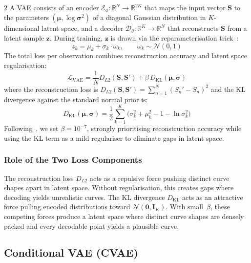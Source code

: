 \documentclass[10pt,a4paper]{article}
\theoremstyle{plain}
\theoremstyle{definition}
\begin{document}
\begin{multicols}{2}
A VAE consists of an encoder $\mathcal{E}_\phi: \mathbb{R}^N \to \mathbb{R}^{2K}$ that maps the input vector $\mathbf{S}$ to the parameters $(\boldsymbol{\mu}, \log\boldsymbol{\sigma}^2)$ of a diagonal Gaussian distribution in $K$-dimensional latent space, and a decoder $\mathcal{D}_\theta: \mathbb{R}^K \to \mathbb{R}^N$ that reconstructs $\mathbf{S}$ from a latent sample $\mathbf{z}$. During training, $\mathbf{z}$ is drawn via the reparameterisation trick~\cite{kingma2013}:
\begin{equation}\label{eq:reparam}
z_k = \mu_k + \sigma_k \cdot \omega_k, \qquad \omega_k \sim \mathcal{N}(0,1)
\end{equation}
The total loss per observation combines reconstruction accuracy and latent space regularisation:
\begin{equation}\label{eq:vae_loss}
\mathcal{L}_{\text{VAE}} = \frac{1}{N}D_{L2}(\mathbf{S}, \mathbf{S}') + \beta\, D_{\mathrm{KL}}(\boldsymbol{\mu}, \boldsymbol{\sigma})
\end{equation}
where the reconstruction loss is $D_{L2}(\mathbf{S}, \mathbf{S}') = \sum_{n=1}^{N}(S_n' - S_n)^2$ and the KL divergence against the standard normal prior is:
\begin{equation}\label{eq:kld}
D_{\mathrm{KL}}(\boldsymbol{\mu}, \boldsymbol{\sigma}) = \frac{1}{2}\sum_{k=1}^{K}\bigl(\sigma_k^2 + \mu_k^2 - 1 - \ln \sigma_k^2\bigr)
\end{equation}
Following~\cite{sokol2022}, we set $\beta = 10^{-7}$, strongly prioritising reconstruction accuracy while using the KL term as a mild regulariser to eliminate gaps in latent space.

\subsubsection{Role of the Two Loss Components}

The reconstruction loss $D_{L2}$ acts as a repulsive force pushing distinct curve shapes apart in latent space. Without regularisation, this creates gaps where decoding yields unrealistic curves. The KL divergence $D_{\mathrm{KL}}$ acts as an attractive force pulling encoded distributions toward $\mathcal{N}(\mathbf{0}, \mathbf{I}_K)$. With small~$\beta$, these competing forces produce a latent space where distinct curve shapes are densely packed and every decodable point yields a plausible curve.

\subsection{Conditional VAE (CVAE)}


\end{multicols}
\end{document}
